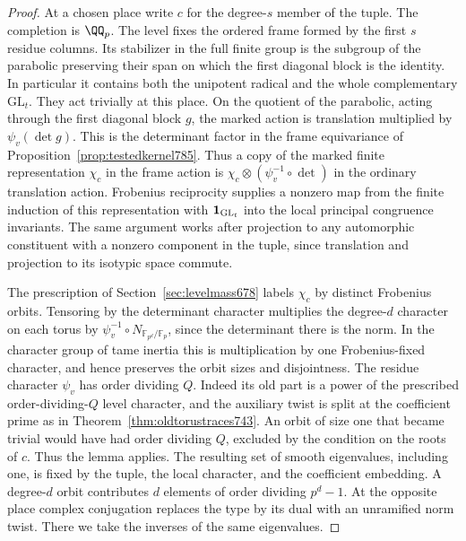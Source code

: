 \documentclass[a4paper,11pt]{article}
\theoremstyle{definition}
\theoremstyle{remark}
\numberwithin{equation}{section}
\begin{document}
\begin{proof}
At a chosen place write \(c\) for the degree-\(s\) member of
the tuple. The completion is \(\QQ_p\). The level fixes the
ordered frame formed by the first \(s\) residue columns. Its
stabilizer in the full finite group is the subgroup of the
parabolic preserving their span on which the first diagonal
block is the identity. In particular it contains both the
unipotent radical and the whole complementary \(\mathrm{GL}_t\).
They act trivially at this place. On the quotient of the
parabolic, acting through the first diagonal block \(g\), the
marked action is translation multiplied by \(\psi_v(\det g)\).
This is the determinant factor in the frame equivariance of
Proposition~\ref{prop:testedkernel785}. Thus a copy of the
marked finite representation \(\chi_c\) in the frame action
is \(\chi_c\otimes(\psi_v^{-1}\circ\det)\) in the ordinary
translation action. Frobenius reciprocity supplies a nonzero map
from the finite induction of this representation with
\({\bf1}_{\mathrm{GL}_t}\) into the local principal congruence
invariants. The same argument works after projection to any
automorphic constituent with a nonzero component in the tuple,
since translation and projection to its isotypic space commute.

The prescription of Section~\ref{sec:levelmass678} labels
\(\chi_c\) by distinct Frobenius orbits. Tensoring by the
determinant character multiplies the degree-\(d\) character
on each torus by \(\psi_v^{-1}\circ N_{\mathbb F_{p^d}/\mathbb F_p}\),
since the determinant there is the norm. In the character group
of tame inertia this is multiplication by one Frobenius-fixed
character, and hence preserves the orbit sizes and disjointness.
The residue character \(\psi_v\) has order dividing \(Q\).
Indeed its old part is a power of the prescribed order-dividing-\(Q\)
level character, and the auxiliary twist is split at the coefficient
prime as in Theorem~\ref{thm:oldtorustraces743}. An orbit of size
one that became trivial would have had order dividing \(Q\),
excluded by the condition on the roots of \(c\). Thus the lemma
applies. The resulting set of smooth eigenvalues, including
one, is fixed by the tuple, the local character, and the coefficient
embedding. A degree-\(d\) orbit contributes \(d\) elements of
order dividing \(p^d-1\). At the opposite place complex conjugation
replaces the type by its dual with an unramified norm twist.
There we take the inverses of the same eigenvalues.


\end{proof}
\end{document}
